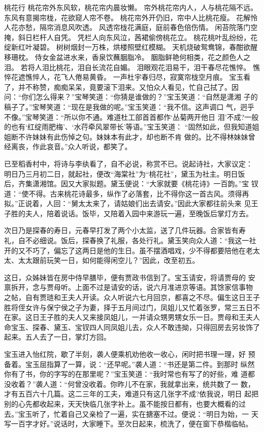 桃花行
桃花帘外东风软，桃花帘内晨妆懒。
帘外桃花帘内人，人与桃花隔不远。
东风有意揭帘栊，花欲窥人帘不卷。
桃花帘外开仍旧，帘中人比桃花瘦。
花解怜人花亦愁，隔帘消息风吹透。
风透帘栊花满庭，庭前春色倍伤情。
闲苔院落门空掩，斜日栏杆人自凭。
凭栏人向东风泣，茜裙偷傍桃花立。
桃花桃叶乱纷纷，花绽新红叶凝碧。
树树烟封一万株，烘楼照壁红模糊。
天机烧破鸳鸯锦，春酣欲醒移珊枕。
侍女金盆进水来，香泉饮蘸胭脂冷。
胭脂鲜艳何相类，花之颜色人之泪。
若将人泪比桃花，泪自长流花自媚。
泪眼观花泪易干，泪干春尽花憔悴。
憔悴花遮憔悴人，花飞人倦易黄昏。
一声杜宇春归尽，寂寞帘栊空月痕。
宝玉看了，并不称赞，痴痴呆呆，竟要滚下泪来。又怕众人看见，忙自己拭了。因
问：“你们怎么得来？”宝琴笑道：“你猜是谁做的？”宝玉笑道：“自然是潇湘
子的稿子了。”宝琴笑道：“现在是我做的呢。”宝玉笑道：“我不信。这声调口
气，迥乎不像。”宝琴笑道：“所以你不通。难道杜工部首首都作‘丛菊两开他日
泪’不成?一般的也有‘红绽雨肥梅’、‘水荇牵风翠带长’等语。”宝玉笑道：
“固然如此，但我知道姐姐断不许妹妹有此伤悼之句。妹妹本有此才，却也断不肯
做的。比不得林妹妹曾经离丧，作此哀音。”众人听说，都笑了。

已至稻香村中，将诗与李纨看了，自不必说，称赏不已。说起诗社，大家议定：
明日乃三月初二日，就起社，便改“海棠社”为“桃花社”，黛玉为社主。明日饭
后，齐集潇湘馆。因又大家拟题。黛玉便说：“大家就要《桃花诗》一百韵。”宝
钗道：“使不得。古来桃花诗最多，纵作了必落套，比不得你这一首古风。须得再
拟。”正说着，人回：“舅太太来了，请姑娘们出去请安。”因此大家都往前头来
见王子胜的夫人，陪着说话。饭毕，又陪着入园中来游玩一遍，至晚饭后掌灯方去。

次日乃是探春的寿日，元春早打发了两个小太监，送了几件玩器。合家皆有寿
礼，自不必细说。饭后，探春换了礼服，各处行礼。黛玉笑向众人道：“我这一社
开的又不巧了，偏忘了这两日是他的生日。虽不摆酒唱戏，少不得都要陪他在老太
太、太太跟前玩笑一日，如何能得闲空儿？”因此，改至初五。

这日，众姊妹皆在房中侍早膳毕，便有贾政书信到了。宝玉请安，将请贾母的
安禀拆开，念与贾母听。上面不过是请安的话，说六月准进京等语。其馀家信事物
之帖，自有贾琏和王夫人开读。众人听说六七月回京，都喜之不尽。偏生这日王子
胜将侄女许与保宁侯之子为妻，择于五月间过门，凤姐儿又忙着张罗，常三五日不
在家。这日王子胜的夫人又来接凤姐儿，一并请众甥男甥女乐一日。贾母和王夫人
命宝玉、探春、黛玉、宝钗四人同凤姐儿去，众人不敢违拗，只得回房去另妆饰了
起来。五人去了一日，掌灯方回。

宝玉进入怡红院，歇了半刻，袭人便乘机劝他收一收心，闲时把书理一理，好
预备着。宝玉屈指算了一算，说：“还早呢。”袭人道：“书还是第二件。到那时
纵然你有了书，你的字写的在那里呢？”宝玉笑道：“我时常也有写了的好些，难
道都没收着？”袭人道：“何曾没收着。你昨儿不在家，我就拿出来，统共数了一
数，才有五百六十几篇。这二三年的工夫，难道只有这几张字不成?依我说，明日
起把别的心先都收起来，天天快临几张字补上。虽不能按日都有，也要大概看的过
去。”宝玉听了，忙着自己又亲检了一遍，实在搪塞不过。便说：“明日为始，一
天写一百字才好。”说话时，大家睡下。至次日起来，梳洗了，便在窗下恭楷临帖。

